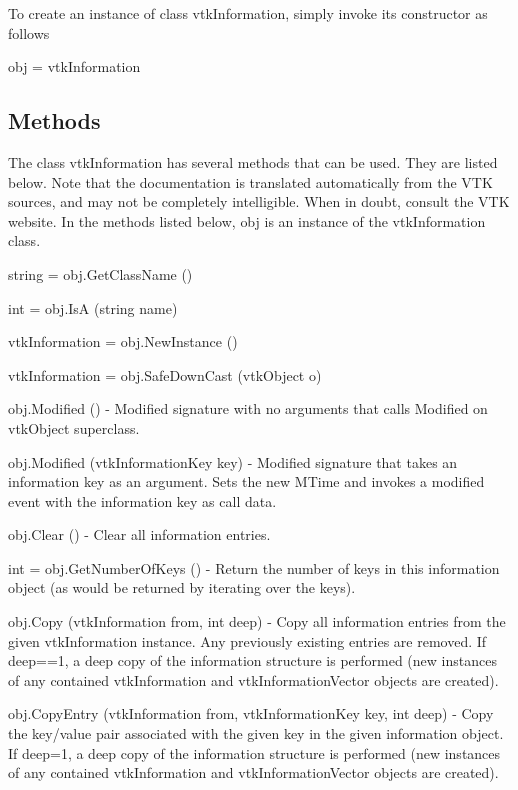 To create an instance of class vtk\-Information, simply invoke its constructor as follows \begin{DoxyVerb}  obj = vtkInformation
\end{DoxyVerb}
 \hypertarget{vtkwidgets_vtkxyplotwidget_Methods}{}\subsection{Methods}\label{vtkwidgets_vtkxyplotwidget_Methods}
The class vtk\-Information has several methods that can be used. They are listed below. Note that the documentation is translated automatically from the V\-T\-K sources, and may not be completely intelligible. When in doubt, consult the V\-T\-K website. In the methods listed below, {\ttfamily obj} is an instance of the vtk\-Information class. 
\begin{DoxyItemize}
\item {\ttfamily string = obj.\-Get\-Class\-Name ()}  
\item {\ttfamily int = obj.\-Is\-A (string name)}  
\item {\ttfamily vtk\-Information = obj.\-New\-Instance ()}  
\item {\ttfamily vtk\-Information = obj.\-Safe\-Down\-Cast (vtk\-Object o)}  
\item {\ttfamily obj.\-Modified ()} -\/ Modified signature with no arguments that calls Modified on vtk\-Object superclass.  
\item {\ttfamily obj.\-Modified (vtk\-Information\-Key key)} -\/ Modified signature that takes an information key as an argument. Sets the new M\-Time and invokes a modified event with the information key as call data.  
\item {\ttfamily obj.\-Clear ()} -\/ Clear all information entries.  
\item {\ttfamily int = obj.\-Get\-Number\-Of\-Keys ()} -\/ Return the number of keys in this information object (as would be returned by iterating over the keys).  
\item {\ttfamily obj.\-Copy (vtk\-Information from, int deep)} -\/ Copy all information entries from the given vtk\-Information instance. Any previously existing entries are removed. If deep==1, a deep copy of the information structure is performed (new instances of any contained vtk\-Information and vtk\-Information\-Vector objects are created).  
\item {\ttfamily obj.\-Copy\-Entry (vtk\-Information from, vtk\-Information\-Key key, int deep)} -\/ Copy the key/value pair associated with the given key in the given information object. If deep=1, a deep copy of the information structure is performed (new instances of any contained vtk\-Information and vtk\-Information\-Vector objects are created).  

\end{DoxyItemize}
